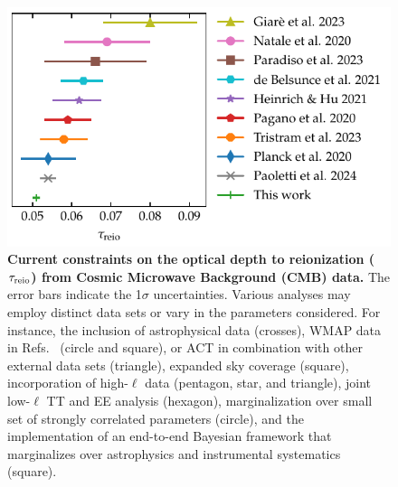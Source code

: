 \begin{figure}[tb]
\centering
\includegraphics{figs/tau_fig.pdf}
\caption{\textbf{Current constraints on the optical depth to
reionization ($\tau_{\mathrm{reio}}$) from Cosmic Microwave Background (CMB)
data.}
The error bars indicate the 1$\sigma$ uncertainties.
Various analyses may employ distinct data sets or vary in the parameters
considered.
For instance, the inclusion of astrophysical data \cite{Paoletti2024} (crosses), WMAP data in Refs.~ \cite{Natale2020,
Paradiso2023} (circle and square), or ACT in combination with other
external data sets \cite{Giare2023} (triangle), expanded sky coverage
\cite{Paradiso2023} (square), incorporation of high-$\ell$ data
\cite{Pagano2020, Planck2020a, Giare2023} (pentagon, star, and
triangle), joint low-$\ell$ TT and EE analysis \cite{deBelsunce2021} (hexagon), marginalization over small set of strongly correlated
parameters \cite{Natale2020} (circle), and the implementation of an
end-to-end Bayesian framework that marginalizes over astrophysics and
instrumental systematics \cite{Paradiso2023} (square).}
\label{fig:tau}
\end{figure}

